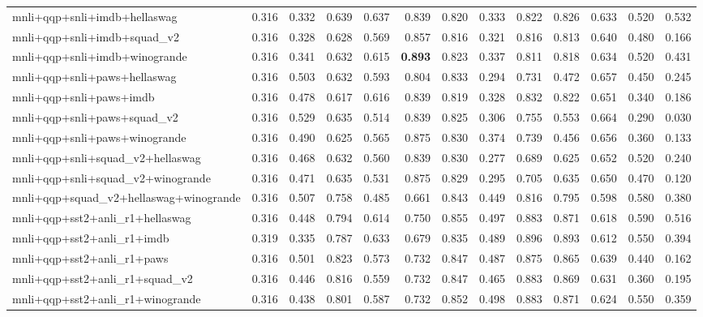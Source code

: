 \begin{table}[t]
\begin{tabular}{lrrrrrrrrrrrr}
    mnli+qqp+snli+imdb+hellaswag & 0.316 & 0.332 & 0.639 & 0.637 & 0.839 & 0.820 & 0.333 & 0.822 & 0.826 & 0.633 & 0.520 & 0.532 \\
    mnli+qqp+snli+imdb+squad\_v2 & 0.316 & 0.328 & 0.628 & 0.569 & 0.857 & 0.816 & 0.321 & 0.816 & 0.813 & 0.640 & 0.480 & 0.166 \\
    mnli+qqp+snli+imdb+winogrande & 0.316 & 0.341 & 0.632 & 0.615 & \textbf{0.893} & 0.823 & 0.337 & 0.811 & 0.818 & 0.634 & 0.520 & 0.431 \\
    mnli+qqp+snli+paws+hellaswag & 0.316 & 0.503 & 0.632 & 0.593 & 0.804 & 0.833 & 0.294 & 0.731 & 0.472 & 0.657 & 0.450 & 0.245 \\
    mnli+qqp+snli+paws+imdb & 0.316 & 0.478 & 0.617 & 0.616 & 0.839 & 0.819 & 0.328 & 0.832 & 0.822 & 0.651 & 0.340 & 0.186 \\
    mnli+qqp+snli+paws+squad\_v2 & 0.316 & 0.529 & 0.635 & 0.514 & 0.839 & 0.825 & 0.306 & 0.755 & 0.553 & 0.664 & 0.290 & 0.030 \\
    mnli+qqp+snli+paws+winogrande & 0.316 & 0.490 & 0.625 & 0.565 & 0.875 & 0.830 & 0.374 & 0.739 & 0.456 & 0.656 & 0.360 & 0.133 \\
    mnli+qqp+snli+squad\_v2+hellaswag & 0.316 & 0.468 & 0.632 & 0.560 & 0.839 & 0.830 & 0.277 & 0.689 & 0.625 & 0.652 & 0.520 & 0.240 \\
    mnli+qqp+snli+squad\_v2+winogrande & 0.316 & 0.471 & 0.635 & 0.531 & 0.875 & 0.829 & 0.295 & 0.705 & 0.635 & 0.650 & 0.470 & 0.120 \\
    mnli+qqp+squad\_v2+hellaswag+winogrande & 0.316 & 0.507 & 0.758 & 0.485 & 0.661 & 0.843 & 0.449 & 0.816 & 0.795 & 0.598 & 0.580 & 0.380 \\
    mnli+qqp+sst2+anli\_r1+hellaswag & 0.316 & 0.448 & 0.794 & 0.614 & 0.750 & 0.855 & 0.497 & 0.883 & 0.871 & 0.618 & 0.590 & 0.516 \\
    mnli+qqp+sst2+anli\_r1+imdb & 0.319 & 0.335 & 0.787 & 0.633 & 0.679 & 0.835 & 0.489 & 0.896 & 0.893 & 0.612 & 0.550 & 0.394 \\
    mnli+qqp+sst2+anli\_r1+paws & 0.316 & 0.501 & 0.823 & 0.573 & 0.732 & 0.847 & 0.487 & 0.875 & 0.865 & 0.639 & 0.440 & 0.162 \\
    mnli+qqp+sst2+anli\_r1+squad\_v2 & 0.316 & 0.446 & 0.816 & 0.559 & 0.732 & 0.847 & 0.465 & 0.883 & 0.869 & 0.631 & 0.360 & 0.195 \\
    mnli+qqp+sst2+anli\_r1+winogrande & 0.316 & 0.438 & 0.801 & 0.587 & 0.732 & 0.852 & 0.498 & 0.883 & 0.871 & 0.624 & 0.550 & 0.359 \\

\end{tabular}
\end{table}
